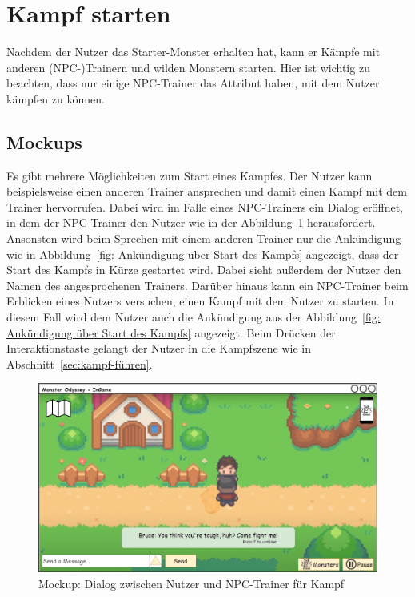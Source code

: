 \section{Kampf starten}\label{sec:kampf-starten}
Nachdem der Nutzer das Starter-Monster erhalten hat, kann er Kämpfe mit anderen (NPC-)Trainern und wilden Monstern starten. Hier ist wichtig zu beachten, dass nur einige NPC-Trainer das Attribut haben, mit dem Nutzer kämpfen zu können.
\subsection{Mockups}\label{subsec:mockups-kampf-starten}
Es gibt mehrere Möglichkeiten zum Start eines Kampfes.
Der Nutzer kann beispielsweise einen anderen Trainer ansprechen und damit einen Kampf mit dem Trainer hervorrufen. Dabei wird im Falle eines NPC-Trainers ein Dialog eröffnet, in dem der NPC-Trainer den Nutzer wie in der Abbildung~\ref{fig: Dialog zwischen Nutzer und NPC-Trainer für Kampf} herausfordert.
Ansonsten wird beim Sprechen mit einem anderen Trainer nur die Ankündigung wie in Abbildung~\ref{fig: Ankündigung über Start des Kampfs} angezeigt, dass der Start des Kampfs in Kürze gestartet wird.
Dabei sieht außerdem der Nutzer den Namen des angesprochenen Trainers.
Darüber hinaus kann ein NPC-Trainer beim Erblicken eines Nutzers versuchen, einen Kampf mit dem Nutzer zu starten. In diesem Fall wird dem Nutzer auch die Ankündigung aus der Abbildung~\ref{fig: Ankündigung über Start des Kampfs} angezeigt.
Beim Drücken der Interaktionstaste gelangt der Nutzer in die Kampfszene wie in Abschnitt~\ref{sec:kampf-führen}.
\begin{figure}[H]
    \center
    \includegraphics[scale=\scale]{images/mockups/Ingame/PlayerAndNPCStartFight.png}
    \caption{Mockup: Dialog zwischen Nutzer und NPC-Trainer für Kampf}
    \label{fig: Dialog zwischen Nutzer und NPC-Trainer für Kampf}
\end{figure}

